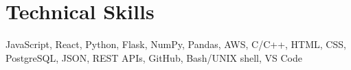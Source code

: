 \documentclass[a4paper,11pt]{article}
\newcommand{\resumeSectionType}[3]{
  \item\begin{tabular*}{0.96\textwidth}[t]{
    p{0.15\linewidth}p{0.02\linewidth}p{0.81\linewidth}
  }
    \textbf{#1} & #2 & #3
  \end{tabular*}\vspace{-2pt}
}
\newcommand{\resumeHeadingListStart}{
  \begin{itemize}[leftmargin=0.0in, label={}]
}
\newcommand{\resumeHeadingListEnd}{\end{itemize}}
\begin{document}
\section{Technical Skills}

JavaScript, React, Python, Flask, NumPy, Pandas, AWS, C/C++, HTML, CSS, PostgreSQL, JSON, REST APIs, GitHub, Bash/UNIX shell, VS Code




\end{document}
